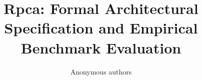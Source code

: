 \title{\textbf{Rpca: Formal Architectural Specification and Empirical Benchmark Evaluation}}

\author{Anonymous authors}
